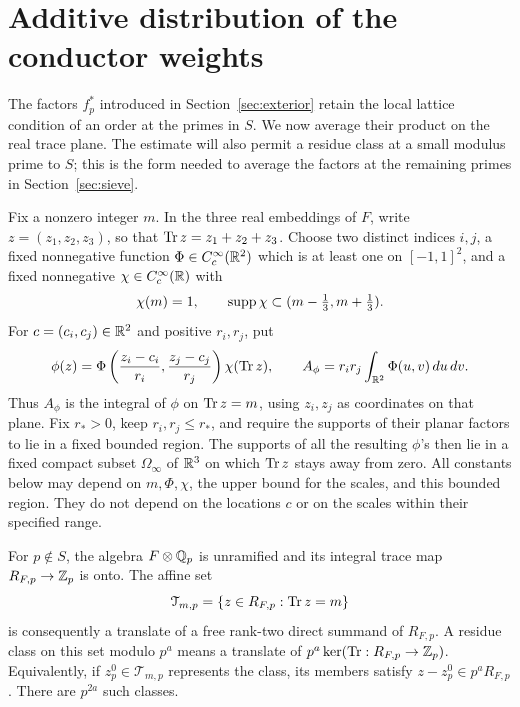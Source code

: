 \section{Additive distribution of the conductor weights}
\label{sec:additive}

The factors \(f_p^*\) introduced in Section~\ref{sec:exterior} retain the
local lattice condition of an order at the primes in \(S\).  We now average their
product on the real trace plane.  The estimate will also permit a residue
class at a small modulus prime to \(S\); this is the form needed to average
the factors at the remaining primes in Section~\ref{sec:sieve}.

Fix a nonzero integer \(m\).  In the three real embeddings of \(F\), write
\(z=(z_1,z_2,z_3)\), so that \(\operatorname{Tr} z=z_1+z_2+z_3\).  Choose two distinct
indices \(i,j\), a fixed nonnegative function
\(\Phi\in C_c^\infty(\mathbb R^2)\) which is at least one on \([-1,1]^2\), and a
fixed nonnegative \(\chi\in C_c^\infty(\mathbb R)\) with
\[
 \chi(m)=1,\qquad
 \operatorname{supp}\chi\subset(m-\tfrac13,m+\tfrac13).
\]
For \(c=(c_i,c_j)\in\mathbb R^2\) and positive \(r_i,r_j\), put
\begin{equation}
 \phi(z)=
 \Phi\left(\frac{z_i-c_i}{r_i},\frac{z_j-c_j}{r_j}\right)\chi(\operatorname{Tr} z),
 \qquad
 A_\phi=r_i r_j\int_{\mathbb R^2}\Phi(u,v)\,du\,dv .
 \label{eq:add-box}
\end{equation}
Thus \(A_\phi\) is the integral of \(\phi\) on \(\operatorname{Tr} z=m\), using \(z_i,z_j\)
as coordinates on that plane.  Fix \(r_*>0\), keep \(r_i,r_j\le r_*\), and
require the supports of their planar factors to lie in a fixed
bounded region.  The supports of all the resulting \(\phi\)'s then lie in a
fixed compact subset \(\Omega_\infty\) of \(\mathbb R^3\) on which \(\operatorname{Tr} z\) stays
away from zero.  All constants below may depend on \(m,\Phi,\chi\), the
upper bound for the scales, and this bounded region.  They do not depend on
the locations \(c\) or on the scales within their specified range.

For \(p\notin S\), the algebra \(F\otimes\mathbb Q_p\) is unramified and its
integral trace map \(R_{F,p}\to\mathbb Z_p\) is onto.  The affine set
\[
 \mathcal T_{m,p}=\{z\in R_{F,p}:\operatorname{Tr} z=m\}
\]
is consequently a translate of a free rank-two direct summand of \(R_{F,p}\).
A residue class on this set modulo \(p^a\) means a translate of
\(p^a\ker(\operatorname{Tr}:R_{F,p}\to\mathbb Z_p)\).  Equivalently, if \(z_p^0\in\mathcal T_{m,p}\)
represents the class, its members satisfy \(z-z_p^0\in p^aR_{F,p}\).
There are \(p^{2a}\) such classes.


